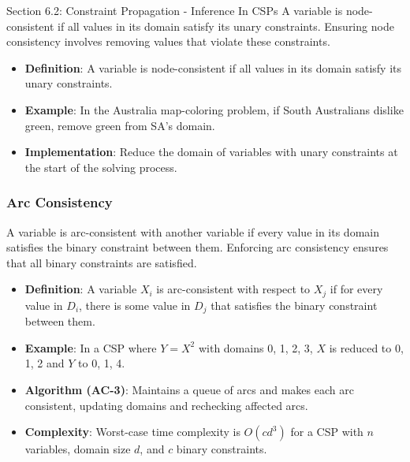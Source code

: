\begin{notes}{Section 6.2: Constraint Propagation - Inference In CSPs}
    A variable is node-consistent if all values in its domain satisfy its unary constraints. Ensuring node consistency involves removing values that violate these constraints.
    
    \begin{highlight}
    
        \begin{itemize}
            \item \textbf{Definition}: A variable is node-consistent if all values in its domain satisfy its unary constraints.
            \item \textbf{Example}: In the Australia map-coloring problem, if South Australians dislike green, remove green from SA's domain.
            \item \textbf{Implementation}: Reduce the domain of variables with unary constraints at the start of the solving process.
        \end{itemize}
    
    \end{highlight}
    
    \subsubsection*{Arc Consistency}
    
    A variable is arc-consistent with another variable if every value in its domain satisfies the binary constraint between them. Enforcing arc consistency ensures that all binary constraints are satisfied.
    
    \begin{highlight}
    
        \begin{itemize}
            \item \textbf{Definition}: A variable $X_i$ is arc-consistent with respect to $X_j$ if for every value in $D_i$, there is some value in $D_j$ that satisfies the binary constraint between them.
            \item \textbf{Example}: In a CSP where $Y = X^2$ with domains {0, 1, 2, 3}, $X$ is reduced to {0, 1, 2} and $Y$ to {0, 1, 4}.
            \item \textbf{Algorithm (AC-3)}: Maintains a queue of arcs and makes each arc consistent, updating domains and rechecking affected arcs.
            \item \textbf{Complexity}: Worst-case time complexity is $O(cd^3)$ for a CSP with $n$ variables, domain size $d$, and $c$ binary constraints.
        \end{itemize}
    

\end{highlight}
\end{notes}
